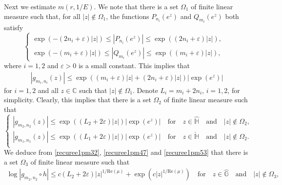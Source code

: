 \documentclass[12pt]{amsart}
\numberwithin{equation}{section}
\begin{document}
Next we estimate $m(r,1/E)$. We note that there is a set $\Omega_1$ of finite linear measure such that, for all $|z|\not\in \Omega_1$, the functions $P_{n_i}(e^{z})$ and $Q_{m_i}(e^z)$ both satisfy
\begin{equation*}%
    \left\{
      \begin{array}{ll}
      \exp(-(2n_i+\varepsilon)|z|)\leq \left|P_{n_i}(e^{z})\right|\leq \exp((2n_i+\varepsilon)|z|),&\\
      \exp(-(m_i+\varepsilon)|z|)\leq \left|Q_{m_i}(e^{z})\right|\leq \exp((m_i+\varepsilon)|z|),&
      \end{array}
    \right.
\end{equation*}
where $i=1,2$ and $\varepsilon>0$ is a small constant. This implies that
\begin{equation*}%
\begin{split}
|g_{m_i,n_i}(z)|\leq \exp((m_i+\varepsilon)|z|+(2n_i+\varepsilon)|z|)\left|\exp(e^z)\right|
\end{split}
\end{equation*}
for $i=1,2$ and all $z\in \mathbb{C}$ such that $|z|\not\in \Omega_1$. Denote $L_i=m_i+2n_i$, $i=1,2$, for simplicity. Clearly, this implies that there is a set $\Omega_2$ of finite linear measure such that
\begin{equation}\label{recuree1pm53}
    \left\{
      \begin{array}{ll}
      |g_{m_2,n_2}(z)|\leq \exp((L_2+2\varepsilon)|z|)\left|\exp\left(e^{z}\right)\right| \quad \text{for} \quad z\in \hat{\mathbb{H}} \quad \text{and} \quad |z|\not\in \Omega_2, & \\
      |g_{m_1,n_1}(z)|\leq \exp((L_1+2\varepsilon)|z|)\left|\exp\left(e^{z}\right)\right| \quad \text{for} \quad z\in \check{\mathbb{H}} \quad \text{and} \quad |z|\not\in \Omega_2. & \\
      \end{array}
    \right.
\end{equation}
We deduce from \eqref{recuree1pm32}, \eqref{recuree1pm47} and \eqref{recuree1pm53} that there is a set $\Omega_3$ of finite linear measure such that
\begin{equation*}%
\begin{split}
\log|g_{m_2,n_2}\circ h| \leq c(L_2+2\varepsilon)|z|^{1/\text{Re}(\mu)}+\exp(c|z|^{1/\text{Re}(\mu)}) \quad \text{for} \quad  z\in \hat{\mathbb{G}} \quad \text{and} \quad  |z|\not\in \Omega_3,
\end{split}
\end{equation*}
\end{document}
